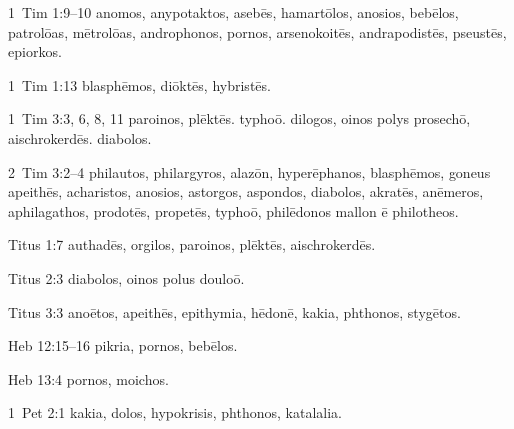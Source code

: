 1~Tim 1:9--10 \gls{anomos}, \gls{anypotaktos}, \gls{asebēs}, \gls{hamartōlos}, \gls{anosios}, \gls{bebēlos}, \gls{patrolōas}, \gls{mētrolōas}, \gls{androphonos}, %
\gls{pornos}, \gls{arsenokoitēs}, \gls{andrapodistēs}, \gls{pseustēs}, \gls{epiorkos}. %

1~Tim 1:13 \gls{blasphēmos}, \gls{diōktēs}, \gls{hybristēs}.

1~Tim 3:3, 6, 8, 11 \gls{paroinos}, \gls{plēktēs}. %
\gls{typhoō}. %
\gls{dilogos}, \gls{oinos polys prosechō}, \gls{aischrokerdēs}. %
\gls{diabolos}. %


2~Tim 3:2--4 \gls{philautos}, \gls{philargyros}, \gls{alazōn}, \gls{hyperēphanos}, \gls{blasphēmos}, \gls{goneus apeithēs}, \gls{acharistos}, \gls{anosios}, %
\gls{astorgos}, \gls{aspondos}, \gls{diabolos}, \gls{akratēs}, \gls{anēmeros}, \gls{aphilagathos}, %
\gls{prodotēs}, \gls{propetēs}, \gls{typhoō}, \gls{philēdonos mallon ē philotheos}. %

Titus 1:7 \gls{authadēs}, \gls{orgilos}, \gls{paroinos}, \gls{plēktēs}, \gls{aischrokerdēs}.

Titus 2:3 \gls{diabolos}, \gls{oinos polus douloō}.

Titus 3:3 \gls{anoētos}, \gls{apeithēs}, \gls{epithymia}, \gls{hēdonē}, \gls{kakia}, \gls{phthonos}, \gls{stygētos}.


Heb 12:15--16 \gls{pikria}, %
\gls{pornos}, \gls{bebēlos}. %

Heb 13:4 \gls{pornos}, \gls{moichos}.

1~Pet 2:1 \gls{kakia}, \gls{dolos}, \gls{hypokrisis}, \gls{phthonos}, \gls{katalalia}.

